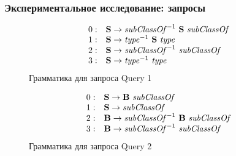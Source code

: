 \documentclass[xcolor=table,aspectratio=169]{beamer}
\begin{document}
\begin{frame}[fragile]
\transwipe[direction=90]
\frametitle{Экспериментальное исследование: запросы}
\begin{figure}[ht]
   \centering

   \[
\begin{array}{rl}
   0: & \textbf{S} \rightarrow \text{\textit{subClassOf}}^{-1} \ \textbf{S} \ \text{\textit{subClassOf}} \\ 
   1: & \textbf{S} \rightarrow \text{\textit{type}}^{-1} \ \textbf{S} \ \text{\textit{type}} \\ 
   2: & \textbf{S} \rightarrow \text{\textit{subClassOf}}^{-1} \ \text{\textit{subClassOf}} \\ 
   3: & \textbf{S} \rightarrow \text{\textit{type}}^{-1} \ \text{\textit{type}} \\ 
\end{array}
\]
   Грамматика для запроса Query 1
   \end{figure}
\begin{figure}[h]%
   \centering

   \[
\begin{array}{rl}
   0: & \textbf{S} \rightarrow \textbf{B} \ \text{\textit{subClassOf}} \\ 
   1: & \textbf{S} \rightarrow \text{\textit{subClassOf}} \\ 
   2: & \textbf{B} \rightarrow \text{\textit{subClassOf}}^{-1} \ \textbf{B} \ \text{\textit{subClassOf}} \\
   3: & \textbf{B} \rightarrow \text{\textit{subClassOf}}^{-1} \ \text{\textit{subClassOf}} \\ 
\end{array}
\]
   Грамматика для запроса Query 2

   \end{figure}

\end{frame}
\end{document}
